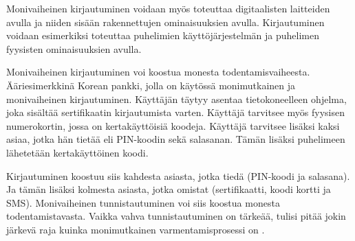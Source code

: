 Monivaiheinen kirjautuminen voidaan myös toteuttaa digitaalisten laitteiden avulla ja niiden sisään rakennettujen ominaisuuksien avulla. Kirjautuminen voidaan esimerkiksi toteuttaa puhelimien käyttöjärjestelmän ja puhelimen fyysisten ominaisuuksien avulla. 

Monivaiheinen kirjautuminen voi koostua monesta todentamisvaiheesta. Ääriesimerkkinä Korean pankki, jolla on käytössä monimutkainen ja monivaiheinen kirjautuminen. Käyttäjän täytyy asentaa tietokoneelleen ohjelma, joka sisältää sertifikaatin kirjautumista varten. Käyttäjä tarvitsee myös fyysisen numerokortin, jossa on kertakäyttöisiä koodeja. Käyttäjä tarvitsee lisäksi kaksi asiaa, jotka hän tietää eli PIN-koodin sekä salasanan. Tämän lisäksi puhelimeen lähetetään kertakäyttöinen koodi.

Kirjautuminen koostuu siis kahdesta asiasta, jotka tiedä (PIN-koodi ja salasana). Ja tämän lisäksi kolmesta asiasta, jotka omistat (sertifikaatti, koodi kortti ja SMS). Monivaiheinen tunnistautuminen voi siis koostua monesta todentamistavasta. Vaikka vahva tunnistautuminen on tärkeää, tulisi pitää jokin järkevä raja kuinka monimutkainen varmentamisprosessi on \citep{rittenhouse2015survey}.


